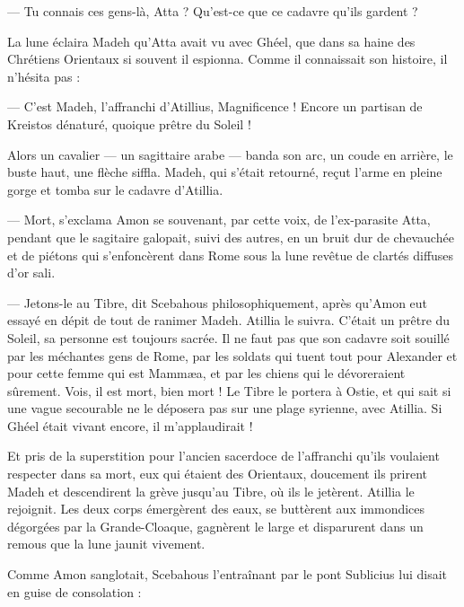 \documentclass[a4paper, 11pt, oneside, polutonikogreek, french]{article}
\begin{document}
--- Tu connais ces gens-là, Atta ? Qu'est-ce que ce cadavre qu'ils gardent ?

La lune éclaira Madeh qu'Atta avait vu avec Ghéel, que dans sa haine des Chrétiens Orientaux si souvent il espionna. Comme il connaissait son histoire, il n'hésita pas :

--- C'est Madeh, l'affranchi d'Atillius, Magnificence ! Encore un partisan de Kreistos dénaturé, quoique prêtre du Soleil !

Alors un cavalier --- un sagittaire arabe --- banda son arc, un coude en arrière, le buste haut, une flèche siffla. Madeh, qui s'était retourné, reçut l'arme en pleine gorge et tomba sur le cadavre d'Atillia.

--- Mort, s'exclama Amon se souvenant, par cette voix, de l'ex-parasite Atta, pendant que le sagitaire galopait, suivi des autres, en un bruit dur de chevauchée et de piétons qui s'enfoncèrent dans Rome sous la lune revêtue de clartés diffuses d'or sali.

--- Jetons-le au Tibre, dit Scebahous philosophiquement, après qu'Amon eut essayé en dépit de tout de ranimer Madeh. Atillia le suivra. C'était un prêtre du Soleil, sa personne est toujours sacrée. Il ne faut pas que son cadavre soit souillé par les méchantes gens de Rome, par les soldats qui tuent tout pour Alexander et pour cette femme qui est Mammæa, et par les chiens qui le dévoreraient sûrement. Vois, il est mort, bien mort ! Le Tibre le portera à Ostie, et qui sait si une vague secourable ne le déposera pas sur une plage syrienne, avec Atillia. Si Ghéel était vivant encore, il m'applaudirait !

Et pris de la superstition pour l'ancien sacerdoce de l'affranchi qu'ils voulaient respecter dans sa mort, eux qui étaient des Orientaux, doucement ils prirent Madeh et descendirent la grève jusqu'au Tibre, où ils le jetèrent. Atillia le rejoignit. Les deux corps émergèrent des eaux, se buttèrent aux immondices dégorgées par la Grande-Cloaque, gagnèrent le large et disparurent dans un remous que la lune jaunit vivement.

Comme Amon sanglotait, Scebahous l'entraînant par le pont Sublicius lui disait en guise de consolation :
\end{document}
